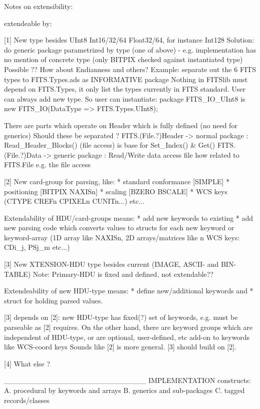 
Notes on extensibility:

extendeable by:

[1] 
New type besides UInt8 Int16/32/64 Float32/64, for instance Int128
Solution: do generic package parametrized by type (one of above) - e.g.
implementation has no mention of concrete type (only BITPIX checked against
instantiated type) Possible ?? How about Endianness and others?
Example: separate out the 6 FITS types to FITS.Types.ads as INFORMATIVE package
Nothing in FITSlib must depend on FITS.Types, it only list the types currently
in FITS standard. User can always add new type.
So user can instantiate:
package FITS_IO_UInt8 is new FITS_IO(DataType => FITS.Types.UInt8);

There are parts which operate on Header which is fully defined (no need for generics)
Should these be separated ?
FITS.(File.?)Header -> normal package  : Read_Header_Blocks() (file access) 
                                         is base for Set_Index() & Get() 
FITS.(File.?)Data   -> generic package : Read/Write data access file
how related to FITS.File e.g. the file access

[2] 
New card-group for parsing, like: 
* standard conformance [SIMPLE]
* positioning [BITPIX NAXISn]
* scaling [BZERO BSCALE]
* WCS keys (CTYPE CREFn CPIXELn CUNITn...)
etc...

Extendability of HDU/card-groups means:
* add new keywords to existing
* add new parsing code which converts values to structs for 
each new keyword or keyword-array 
(1D array like NAXISn, 
2D arrays/matrices like n WCS keys: CDi_j, PSj_m etc...)

[3] 
New XTENSION-HDU type besides current (IMAGE, ASCII- and BIN-TABLE)
Note: Primary-HDU is fixed and defined, not extendable??

Extendeability of new HDU-type means: 
* define new/additional keywords and 
* struct for holding parsed values.

[3] depends on [2]: new HDU-type has fixed(?) set of keywords,
e.g. must be parseable as [2] requires.
On the other hand, there are keyword groups which are independent
of HDU-type, or are optional, user-defined, etc add-on to keywords
like WCS-coord keys
Sounds like [2] is more general. [3] should build on [2].

[4] What else ?

___________________________
IMPLEMENTATION constructs:
A. procedural by keywords and arrays
B. generics and sub-packages
C. tagged records/classes

